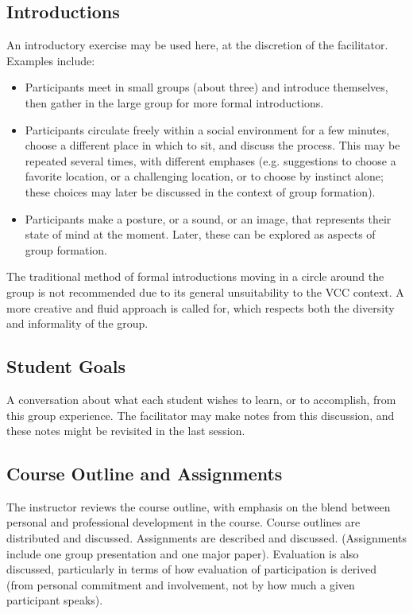 \documentclass[12pt,DIV7,oneside,tocindent,headsepline]{scrbook}
\begin{document}
\subsection{Introductions}  
An introductory exercise may be used here, at the discretion of the facilitator. Examples include: 
\begin{itemize} 
\item Participants meet in small groups (about three) and introduce themselves, then gather in the large group for more formal introductions. 
\item Participants circulate freely within a social environment for a few minutes, choose a different place in which to sit, and discuss the process. This may be repeated several times, with different emphases (e.g. suggestions to choose a favorite location, or a challenging location, or to choose by instinct alone; these choices may later be discussed in the context of group formation). 
\item Participants make a posture, or a sound, or an image, that represents their state of mind at the moment. Later, these can be explored as aspects of group formation. 
\end{itemize}  
The traditional method of formal introductions moving in a circle around the group is not recommended due to its general unsuitability to the VCC context. A more creative and fluid approach is called for, which respects both the diversity and informality of the group. 

\subsection{Student Goals}  
A conversation about what each student wishes to learn, or to accomplish, from this group experience. The facilitator may make notes from this discussion, and these notes might be revisited in the last session.  

\subsection{Course Outline and Assignments}  
The instructor reviews the course outline, with emphasis on the blend between personal and professional development in the course. Course outlines are distributed and discussed. Assignments are described and discussed. (Assignments include one group presentation and one major paper). Evaluation is also discussed, particularly in terms of how evaluation of participation is derived (from personal commitment and involvement, not by how much a given participant speaks). 
\end{document}
